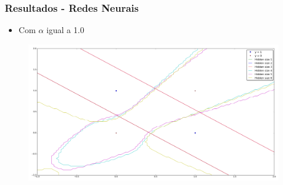 \documentclass[10pt]{beamer}
\begin{document}
\begin{frame}
  \frametitle{Resultados - Redes Neurais}

  \begin{itemize}
  \item Com $\alpha$ igual a 1.0
 \end{itemize}

  \begin{adjustwidth}{-3em}{-3em}
  \begin{figure}[htb]
    \begin{center}
        \includegraphics[scale=0.18]{img/boundaries_rnns.png}
    \end{center}
  \end{figure}
  \end{adjustwidth}
\end{frame}
\end{document}

